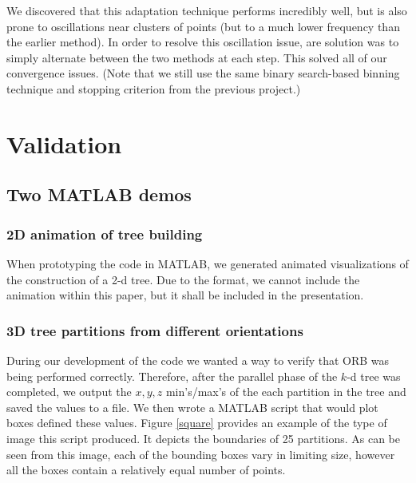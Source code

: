\documentclass{article}
\begin{document}
We discovered that this adaptation technique performs incredibly well, but is also prone to oscillations near clusters of points (but to a much lower frequency than the earlier method). In order to resolve this oscillation issue, are solution was to simply alternate between the two methods at each step. This solved all of our convergence issues. (Note that we still use the same binary search-based binning technique and stopping criterion from the previous project.)

\section{Validation}

\subsection{Two MATLAB demos}

\subsubsection{2D animation of tree building}
When prototyping the code in MATLAB, we generated animated visualizations of the construction of a 2-d tree. Due to the format, we cannot include the animation within this paper, but it shall be included in the presentation.

\subsubsection{3D tree partitions from different orientations}
During our development of the code we wanted a way to verify that ORB was being performed correctly. Therefore, after the parallel phase of the $k$-d tree was completed, we output the $x,y,z$ min's/max's of the each partition in the tree and saved the values to a file. We then wrote a MATLAB script that would plot boxes defined these values. Figure \ref{square} provides an example of the type of image this script produced. It depicts the boundaries of 25 partitions. As can be seen from this image, each of the bounding boxes vary in limiting size, however all the boxes contain a relatively equal number of points.
\end{document}
